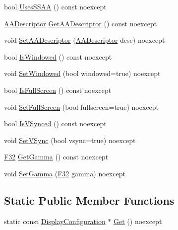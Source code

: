 \begin{DoxyCompactItemize}
\item 
bool \hyperlink{structmage_1_1_display_configuration_a61dcb66358a3fd9e4df2230946ce1a36}{Uses\+S\+S\+AA} () const noexcept
\item 
\hyperlink{namespacemage_a86cd40b8f2f42ca4d616cc6ec665a7f2}{A\+A\+Descriptor} \hyperlink{structmage_1_1_display_configuration_a8022cbb0f6df7250aae675cab32d68af}{Get\+A\+A\+Descriptor} () const noexcept
\item 
void \hyperlink{structmage_1_1_display_configuration_a2fec79b21c772a3d73e44cca7d8bd9d7}{Set\+A\+A\+Descriptor} (\hyperlink{namespacemage_a86cd40b8f2f42ca4d616cc6ec665a7f2}{A\+A\+Descriptor} desc) noexcept
\item 
bool \hyperlink{structmage_1_1_display_configuration_ae35fedcd9989950c5f15785632dd7a86}{Is\+Windowed} () const noexcept
\item 
void \hyperlink{structmage_1_1_display_configuration_ac6228139b3fae3b5fb454aa072b94efd}{Set\+Windowed} (bool windowed=true) noexcept
\item 
bool \hyperlink{structmage_1_1_display_configuration_ab984b32ff2b6ce6a376aa09399b9b45e}{Is\+Full\+Screen} () const noexcept
\item 
void \hyperlink{structmage_1_1_display_configuration_a570746cd01c6a95c217aa03a954b5fd1}{Set\+Full\+Screen} (bool fullscreen=true) noexcept
\item 
bool \hyperlink{structmage_1_1_display_configuration_ab237c9b7953853eb83a51d542dfffb5e}{Is\+V\+Synced} () const noexcept
\item 
void \hyperlink{structmage_1_1_display_configuration_a7a14343be4f07dcdf4e8be66a118da29}{Set\+V\+Sync} (bool vsync=true) noexcept
\item 
\hyperlink{namespacemage_aa97e833b45f06d60a0a9c4fc22ae02c0}{F32} \hyperlink{structmage_1_1_display_configuration_a7b86a9b87951e560bc910d6537dc2f2f}{Get\+Gamma} () const noexcept
\item 
void \hyperlink{structmage_1_1_display_configuration_a83f33815b5a7d644e33335781a549718}{Set\+Gamma} (\hyperlink{namespacemage_aa97e833b45f06d60a0a9c4fc22ae02c0}{F32} gamma) noexcept
\end{DoxyCompactItemize}
\subsection*{Static Public Member Functions}
\begin{DoxyCompactItemize}
\item 
static const \hyperlink{structmage_1_1_display_configuration}{Display\+Configuration} $\ast$ \hyperlink{structmage_1_1_display_configuration_a186aca1e5dabb6d819ff16c9aca6edfc}{Get} () noexcept
\end{DoxyCompactItemize}
